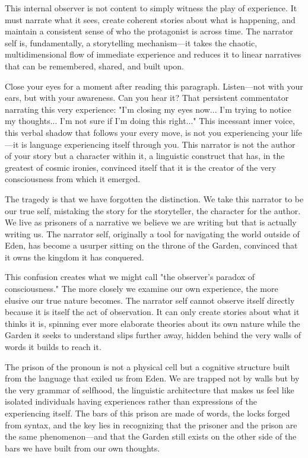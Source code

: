 This internal observer is not content to simply witness the play of experience. It must narrate what it sees, create coherent stories about what is happening, and maintain a consistent sense of who the protagonist is across time. The narrator self is, fundamentally, a storytelling mechanism—it takes the chaotic, multidimensional flow of immediate experience and reduces it to linear narratives that can be remembered, shared, and built upon.

Close your eyes for a moment after reading this paragraph. Listen—not with your ears, but with your awareness. Can you hear it? That persistent commentator narrating this very experience: "I'm closing my eyes now... I'm trying to notice my thoughts... I'm not sure if I'm doing this right..." This incessant inner voice, this verbal shadow that follows your every move, is not you experiencing your life—it is language experiencing itself through you. This narrator is not the author of your story but a character within it, a linguistic construct that has, in the greatest of cosmic ironies, convinced itself that it is the creator of the very consciousness from which it emerged.

The tragedy is that we have forgotten the distinction. We take this narrator to be our true self, mistaking the story for the storyteller, the character for the author. We live as prisoners of a narrative we believe we are writing but that is actually writing us. The narrator self, originally a tool for navigating the world outside of Eden, has become a usurper sitting on the throne of the Garden, convinced that it owns the kingdom it has conquered.

This confusion creates what we might call "the observer's paradox of consciousness." The more closely we examine our own experience, the more elusive our true nature becomes. The narrator self cannot observe itself directly because it is itself the act of observation. It can only create stories about what it thinks it is, spinning ever more elaborate theories about its own nature while the Garden it seeks to understand slips further away, hidden behind the very walls of words it builds to reach it.

The prison of the pronoun is not a physical cell but a cognitive structure built from the language that exiled us from Eden. We are trapped not by walls but by the very grammar of selfhood, the linguistic architecture that makes us feel like isolated individuals having experiences rather than expressions of the experiencing itself. The bars of this prison are made of words, the locks forged from syntax, and the key lies in recognizing that the prisoner and the prison are the same phenomenon—and that the Garden still exists on the other side of the bars we have built from our own thoughts.

